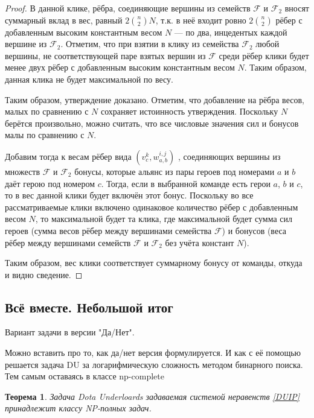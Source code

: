 \documentclass{article}
\newtheorem{theorem}{Теорема}
\begin{document}
\begin{proof}
    В данной клике, рёбра, соединяющие вершины из семейств $\mathcal{F}$ и $\mathcal{F}_2$ вносят суммарный вклад в вес, равный $2 \binom{n}{2} N$, т.к. в неё входит ровно $2 \binom{n}{2}$ рёбер с добавленным высоким константным весом $N$ --- по два, инцедентых каждой вершине из $\mathcal{F}_2$. Отметим, что при взятии в клику из семейства $\mathcal{F}_2$ любой вершины, не соответствующей паре взятых вершин из $\mathcal{F}$ среди рёбер клики будет менее двух рёбер с добавленным высоким константным весом $N$. Таким образом, данная клика не будет максимальной по весу.
    
Таким образом, утверждение доказано. Отметим, что добавление на рёбра весов, малых по сравнению с $N$ сохраняет истоинность утверждения. Поскольку $N$ берётся произвольно, можно считать, что все числовые значения сил и бонусов малы по сравнению с $N$.

Добавим тогда к весам рёбер вида  $(v_c^{k}, w_{a,b}^{i,j} )$ , соединяющих вершины из множеств 
$\mathcal{F}$ и $\mathcal{F}_2$ бонусы, которые альянс из пары героев под номерами $a$ и $b$ даёт герою под номером $c$. Тогда, если в выбранной команде есть герои $a$, $b$ и $c$, то в вес данной клики будет включён этот бонус. Поскольку во все рассматриваемые клики включено одинаковое количество рёбер с добавленным весом $N$, то максимальной будет та клика, где максимальной будет сумма сил героев (сумма весов рёбер между вершинами семейства $\mathcal{F}$) и бонусов (веса рёбер между вершинами семейств $\mathcal{F}$ и $\mathcal{F}_2$ без учёта констант $N$).
    
Таким образом, вес клики соответствует суммарному бонусу от команды, откуда и видно сведение.
    
\end{proof}


\subsection{Всё вместе. Небольшой итог}



Вариант задачи в версии "Да/Нет". 

Можно вставить про  то, как да/нет версия формулируется. И как с её помощью решается задача DU  за логарифмическую сложность методом бинарного поиска. Тем самым оставаясь в классе np-complete

\begin{theorem}
    Задача Dota Underloards задаваемая системой неравенств \ref{DUIP} принадлежит классу NP-полных задач.
\end{theorem}
\end{document}
